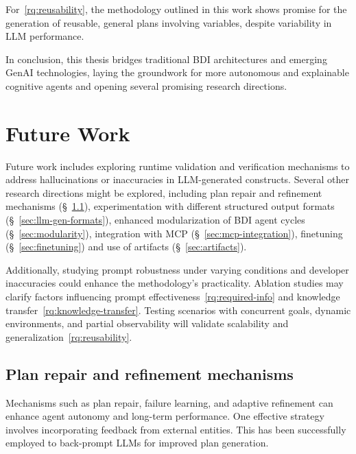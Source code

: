 \documentclass[12pt,a4paper,openright,twoside]{book}
\begin{document}
For~\cref{rq:reusability}, the methodology outlined in this work shows promise for the generation of reusable, general plans involving variables, despite variability in \ac{LLM} performance.

In conclusion, this thesis bridges traditional \ac{BDI} architectures and emerging \ac{GenAI} technologies, laying the groundwork for more autonomous and explainable cognitive agents and opening several promising research directions.

\section{Future Work}

Future work includes exploring runtime validation and verification mechanisms to address hallucinations or inaccuracies in \ac{LLM}-generated constructs.
%
Several other research directions might be explored, including plan repair and refinement mechanisms (\S~\ref{sec:plan-repair}), experimentation with different structured output formats (\S~\ref{sec:llm-gen-formats}), enhanced modularization of BDI agent cycles (\S~\ref{sec:modularity}), integration with \ac{MCP} (\S~\ref{sec:mcp-integration}), finetuning (\S~\ref{sec:finetuning}) and use of artifacts (\S~\ref{sec:artifacts}).

Additionally, studying prompt robustness under varying conditions and developer inaccuracies could enhance the methodology's practicality.
%
Ablation studies may clarify factors influencing prompt effectiveness~\ref{rq:required-info} and knowledge transfer~\ref{rq:knowledge-transfer}.
%
Testing scenarios with concurrent goals, dynamic environments, and partial observability will validate scalability and generalization~\ref{rq:reusability}.

\subsection{Plan repair and refinement mechanisms}\label{sec:plan-repair}

Mechanisms such as plan repair, failure learning, and adaptive refinement can enhance agent autonomy and long-term performance.
%
One effective strategy involves incorporating feedback from external entities.
%
This has been successfully employed to back-prompt \acp{LLM} for improved plan generation.
\end{document}
